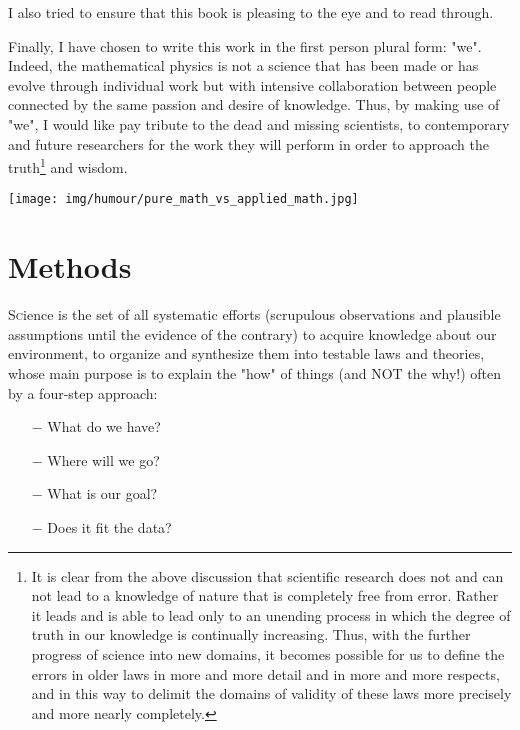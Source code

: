 	I also tried to ensure that this book is pleasing to the eye and to read through.
	
	Finally, I have chosen to write this work in the first person plural form: "we". Indeed, the mathematical physics is not a science that has been made or has evolve through individual work but with intensive collaboration between people connected by the same passion and desire of knowledge. Thus, by making use of "we", I would like pay tribute to the dead and missing scientists, to contemporary and future researchers for the work they will perform in order to approach the truth\footnote{It is clear from the above discussion that scientific research does not and can not lead to a knowledge of nature that is completely free from error. Rather it leads and is able to lead only to an unending process in which the degree of truth in our knowledge is continually increasing. Thus, with the further progress of science into new domains, it becomes possible for us to define the errors in older laws in more and more detail and in more and more respects, and in this way to delimit the domains of validity of these laws more precisely and more nearly completely.} and wisdom.
	
	\begin{center}
	\texttt{[image: img/humour/pure\_math\_vs\_applied\_math.jpg]}
	\end{center}

	\newpage
	\thispagestyle{empty}
	\mbox{}
	\section{Methods}	
	\lettrine[lines=4]{\color{BrickRed}S}cience is the set of all systematic efforts (scrupulous observations and plausible assumptions until the evidence of the contrary) to acquire knowledge about our environment, to organize and synthesize them into testable laws and theories, whose main purpose is to explain the "how" of things (and NOT the why!) often by a four-step approach:
	
	\begin{itemize}
		\item[$-$] What do we have?
		\item[$-$] Where will we go?
		\item[$-$] What is our goal?	
		\item[$-$] Does it fit the data?
	\end{itemize}
	
